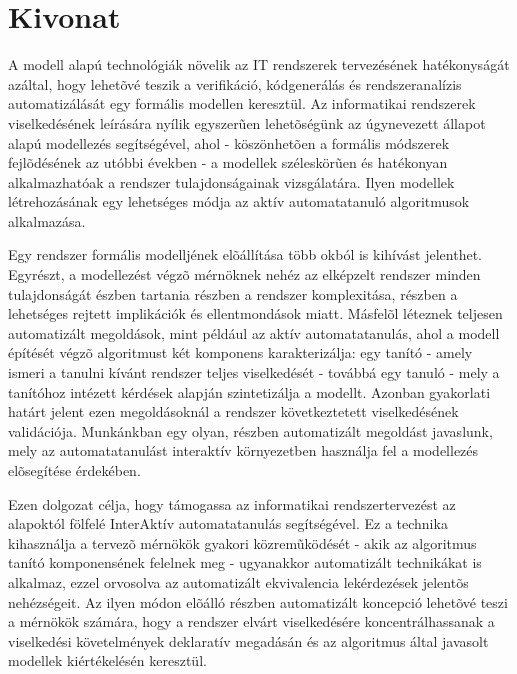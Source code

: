 \setcounter{page}{1}

\selecthungarian

\chapter*{Kivonat}

A modell alapú technológiák növelik az IT rendszerek tervezésének hatékonyságát azáltal, hogy lehet\~{o}vé teszik a verifikáció, kódgenerálás és rendszeranalízis automatizálását egy formális modellen keresztül. Az informatikai rendszerek viselkedésének leírására nyílik egyszer\~{u}en lehet\~{o}ségünk az úgynevezett állapot alapú modellezés segítségével, ahol - köszönhet\~{o}en a formális módszerek fejl\~{o}désének az utóbbi években - a modellek széleskör\~{u}en és hatékonyan alkalmazhatóak a rendszer tulajdonságainak vizsgálatára. Ilyen modellek létrehozásának egy lehetséges módja az aktív automatatanuló algoritmusok alkalmazása.

Egy rendszer formális modelljének el\~{o}állítása több okból is kihívást jelenthet. Egyrészt, a modellezést végz\~{o} mérnöknek nehéz az elképzelt rendszer minden tulajdonságát észben tartania részben a rendszer komplexitása, részben a lehetséges rejtett implikációk és ellentmondások miatt. Másfel\~{o}l léteznek teljesen automatizált megoldások, mint például az aktív automatatanulás, ahol a modell építését végz\~{o} algoritmust két komponens karakterizálja: egy tanító - amely ismeri a tanulni kívánt rendszer teljes viselkedését - továbbá egy tanuló - mely a tanítóhoz intézett kérdések alapján szintetizálja a modellt. Azonban gyakorlati határt jelent ezen megoldásoknál a rendszer következtetett viselkedésének validációja. Munkánkban egy olyan, részben automatizált megoldást javaslunk, mely az automatatanulást interaktív környezetben használja fel a modellezés el\~{o}segítése érdekében.

Ezen dolgozat célja, hogy támogassa az informatikai rendszertervezést az alapoktól fölfelé InterAktív automatatanulás segítségével. Ez a technika kihasználja a tervez\~{o} mérnökök gyakori közrem\~{u}ködését - akik az algoritmus tanító komponensének felelnek meg - ugyanakkor automatizált technikákat is alkalmaz, ezzel orvosolva az automatizált ekvivalencia lekérdezések jelent\~{o}s nehézségeit. Az ilyen módon el\~{o}álló részben automatizált koncepció lehet\~{o}vé teszi a mérnökök számára, hogy a rendszer elvárt viselkedésére koncentrálhassanak a viselkedési követelmények deklaratív megadásán és az algoritmus által javasolt modellek kiértékelésén keresztül.

